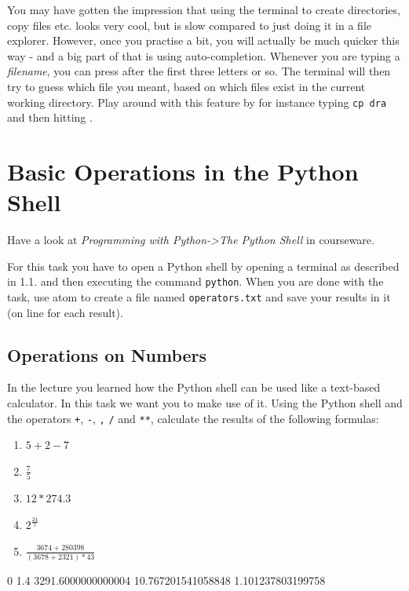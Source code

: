You may have gotten the impression that using the terminal to create directories, copy files etc. looks very cool, but is slow compared to just doing it in a file explorer. However, once you practise a bit, you will actually be much quicker this way - and a big part of that is using auto-completion. Whenever you are typing a \textit{filename}, you can press \keys{\tab} after the first three letters or so. The terminal will then try to guess which file you meant, based on which files exist in the current working directory. Play around with this feature by for instance typing \texttt{cp dra} and then hitting \keys{\tab}.


\section{Basic Operations in the Python Shell}

Have a look at \textit{Programming with Python->The Python Shell} in courseware.
\newline


\noindent For this task you have to open a Python shell by opening a terminal as described in 1.1. and then executing the command \texttt{python}. When you are done with the task, use atom to create a file named \texttt{operators.txt} and save your results in it (on line for each result).

\subsection{Operations on Numbers}

In the lecture you learned how the Python shell can be used like a text-based calculator. In this task we want you to make use of it. Using the Python shell and the operators \texttt+, \texttt-, \texttt*, \texttt/ and \texttt{**}, calculate the results of the following formulas:

\begin{enumerate}

\item $5 + 2 - 7$
\item $\frac{7}{5}$
\item $12 * 274.3$
\item $2^{\frac{24}{7}}$
\item $\frac{3674 + 280398}{(3678 + 2321) * 43}$

\end{enumerate}

\begin{solution}
    \begin{outputcode}
0
1.4
3291.6000000000004
10.767201541058848
1.101237803199758
    \end{outputcode}
\end{solution}

